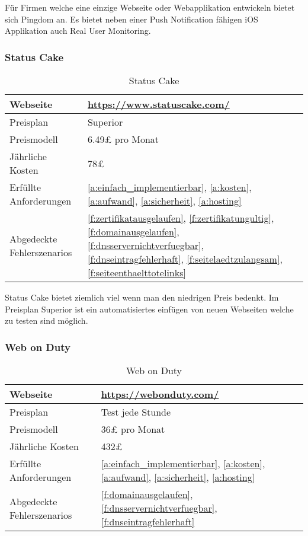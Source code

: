 Für Firmen welche eine einzige Webseite oder Webapplikation entwickeln bietet sich Pingdom an. Es bietet neben einer Push Notification fähigen iOS Applikation auch Real User Monitoring.

\subsubsection{Status Cake}
\label{ssub:status_cake}

\begin{table}[H]
  \centering
  \begin{tabular}{p{5cm} p{7cm}}
  \toprule
    Webseite & \url{https://www.statuscake.com/}\\
  \hline
    Preisplan & Superior\\
  \hline
    Preismodell & 6.49£ pro Monat\\
  \hline
    Jährliche Kosten & 78£\\
  \hline
    Erfüllte Anforderungen & \ref{a:einfach_implementierbar}, \ref{a:kosten}, \ref{a:aufwand}, \ref{a:sicherheit}, \ref{a:hosting}\\
  \hline
    Abgedeckte Fehlerszenarios & \ref{f:zertifikatausgelaufen}, \ref{f:zertifikatungultig}, \ref{f:domainausgelaufen}, \ref{f:dnsservernichtverfuegbar}, \ref{f:dnseintragfehlerhaft}, \ref{f:seitelaedtzulangsam}, \ref{f:seiteenthaelttotelinks}\\
  \bottomrule
  \end{tabular}
  \caption{Status Cake}
  \label{tab:status_cake}
\end{table}

Status Cake bietet ziemlich viel wenn man den niedrigen Preis bedenkt. Im Preisplan Superior ist ein automatisiertes einfügen von neuen Webseiten welche zu testen sind möglich.

\subsubsection{Web on Duty}
\label{ssub:web_on_duty}

\begin{table}[H]
  \centering
  \begin{tabular}{p{5cm} p{7cm}}
  \toprule
    Webseite & \url{https://webonduty.com/}\\
  \hline
    Preisplan & Test jede Stunde\\
  \hline
    Preismodell & 36£ pro Monat\\
  \hline
    Jährliche Kosten & 432£\\
  \hline
    Erfüllte Anforderungen & \ref{a:einfach_implementierbar}, \ref{a:kosten}, \ref{a:aufwand}, \ref{a:sicherheit}, \ref{a:hosting}\\
  \hline
    Abgedeckte Fehlerszenarios & \ref{f:domainausgelaufen}, \ref{f:dnsservernichtverfuegbar}, \ref{f:dnseintragfehlerhaft}\\
  \bottomrule
  \end{tabular}
  \caption{Web on Duty}
  \label{tab:web_on_duty}
\end{table}

